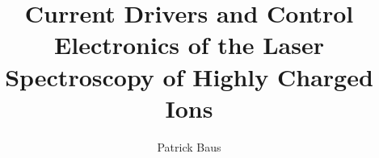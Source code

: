 \documentclass[
	ruledheaders=chapter,%
	class=book,%
	thesis={type=dr, dr=rernat},
	accentcolor=1b,  %
	custommargins=geometry,  %
	marginpar=false,%
	title=small,
	fontsize=11pt,%
	IMRAD=false,
	twoside,
]{apqpub}
\begin{document}
	\title{Current Drivers and Control Electronics of the Laser Spectroscopy of Highly Charged Ions}
	\author{Patrick Baus}

	\submissiondate{\today}
	\examdate{\today}
	\maketitle

	
	\tableofcontents
	
    

    
    

\end{document}
